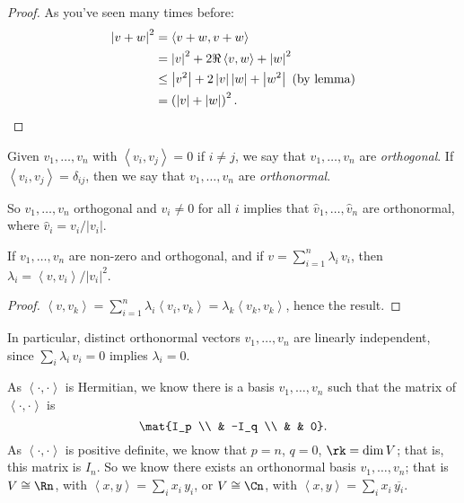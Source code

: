 \begin{proof}
	As you've seen many times before:
	\begin{align*}
		\left\vert v+w \right\vert^2
		&= \left\langle v+w,v+w \right\rangle \\
		&= \left\vert v \right\vert^2+2\Re\left\langle v,w \right\rangle+\left\vert w \right\vert^2 \\
		&\leq \left\vert v^2 \right\vert+2\left\vert v \right\vert\left\vert w \right\vert + \left\vert w^2 \right\vert \text{ (by lemma)} \\ %
		&=\left( \left\vert v \right\vert+\left\vert w \right\vert \right)^2. \qedhere
	\end{align*}
\end{proof}

 Given $v_1,\ldots,v_n$ with $\left\langle v_i,v_j \right\rangle=0$ if $i\neq j$, we say that $v_1,\ldots,v_n$ are \emph{orthogonal}. If $\left\langle v_i,v_j \right\rangle=\delta_{ij}$, then we say that $v_1,\ldots,v_n$ are \emph{orthonormal}.

So $v_1,\ldots,v_n$ orthogonal and $v_i\neq 0$ for all $i$ implies that $\hat{v}_1,\ldots,\hat{v}_n$ are orthonormal, where $\hat{v}_i = v_i/\left\vert v_i \right\vert$.

\begin{lemma}
	If $v_1,\ldots,v_n$ are non-zero and orthogonal, and if $v=\sum_{i=1}^n \lambda_i\,v_i$, then $\lambda_i = \left\langle v,v_i \right\rangle/\left\vert v_i \right\vert^2$.  %
\end{lemma}

\begin{proof}
	$\left\langle v,v_k \right\rangle = \sum_{i=1}^n \lambda_i \left\langle v_i,v_k \right\rangle = \lambda_k \left\langle v_k,v_k \right\rangle$, hence the result. %
\end{proof}

In particular, distinct orthonormal vectors $v_1,\ldots,v_n$ are linearly independent, since $\sum_i \lambda_i\,v_i = 0$ implies $\lambda_i=0$.

As $\left\langle \cdot,\cdot \right\rangle$ is Hermitian, we know there is a basis $v_1,\ldots,v_n$ such that the matrix of $\left\langle \cdot,\cdot \right\rangle$ is
\begin{equation*}
	\mat{I_p \\ & -I_q \\ & & 0}.
\end{equation*}
As $\left\langle \cdot,\cdot \right\rangle$ is positive definite, we know that $p=n$, $q=0$, $\rk=\dim V$; that is, this matrix is $I_n$. So we know there exists an orthonormal basis $v_1,\ldots,v_n$; that is $V\cong \Rn$, with $\left\langle x,y \right\rangle = \sum_i x_i\,y_i$, or $V\cong\Cn$, with $\left\langle x,y \right\rangle = \sum_i x_i\,\overline{y{_i}}$.

